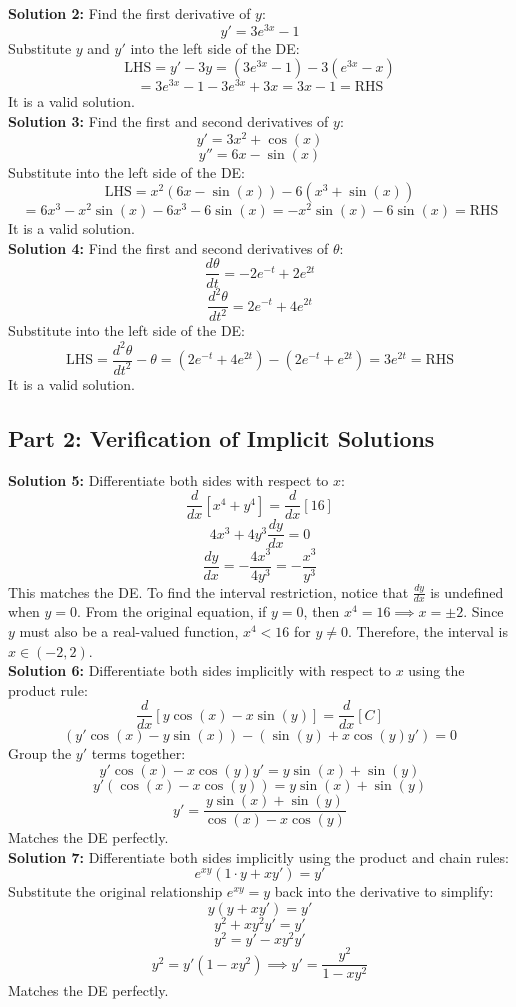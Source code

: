 \documentclass[12pt]{article}
\begin{document}
\noindent \textbf{Solution 2:} Find the first derivative of $y$:
$$y' = 3e^{3x} - 1$$
Substitute $y$ and $y'$ into the left side of the DE:
$$\text{LHS} = y' - 3y = (3e^{3x} - 1) - 3(e^{3x} - x)$$
$$= 3e^{3x} - 1 - 3e^{3x} + 3x = 3x - 1 = \text{RHS}$$
It is a valid solution. \\

\noindent \textbf{Solution 3:} Find the first and second derivatives of $y$:
$$y' = 3x^2 + \cos(x)$$
$$y'' = 6x - \sin(x)$$
Substitute into the left side of the DE:
$$\text{LHS} = x^2(6x - \sin(x)) - 6(x^3 + \sin(x))$$
$$= 6x^3 - x^2\sin(x) - 6x^3 - 6\sin(x) = -x^2\sin(x) - 6\sin(x) = \text{RHS}$$
It is a valid solution. \\

\noindent \textbf{Solution 4:} Find the first and second derivatives of $\theta$:
$$\frac{d\theta}{dt} = -2e^{-t} + 2e^{2t}$$
$$\frac{d^2\theta}{dt^2} = 2e^{-t} + 4e^{2t}$$
Substitute into the left side of the DE:
$$\text{LHS} = \frac{d^2\theta}{dt^2} - \theta = (2e^{-t} + 4e^{2t}) - (2e^{-t} + e^{2t}) = 3e^{2t} = \text{RHS}$$
It is a valid solution.

\subsection*{Part 2: Verification of Implicit Solutions}
\textbf{Solution 5:} Differentiate both sides with respect to $x$:
$$\frac{d}{dx}[x^4 + y^4] = \frac{d}{dx}[16]$$
$$4x^3 + 4y^3 \frac{dy}{dx} = 0$$
$$\frac{dy}{dx} = -\frac{4x^3}{4y^3} = -\frac{x^3}{y^3}$$
This matches the DE. To find the interval restriction, notice that $\frac{dy}{dx}$ is undefined when $y=0$. From the original equation, if $y=0$, then $x^4 = 16 \implies x = \pm 2$. Since $y$ must also be a real-valued function, $x^4 < 16$ for $y \neq 0$. Therefore, the interval is $x \in (-2, 2)$. \\

\noindent \textbf{Solution 6:} Differentiate both sides implicitly with respect to $x$ using the product rule:
$$\frac{d}{dx}[y \cos(x) - x \sin(y)] = \frac{d}{dx}[C]$$
$$\left( y' \cos(x) - y \sin(x) \right) - \left( \sin(y) + x \cos(y) y' \right) = 0$$
Group the $y'$ terms together:
$$y' \cos(x) - x \cos(y) y' = y \sin(x) + \sin(y)$$
$$y' (\cos(x) - x \cos(y)) = y \sin(x) + \sin(y)$$
$$y' = \frac{y \sin(x) + \sin(y)}{\cos(x) - x \cos(y)}$$
Matches the DE perfectly. \\

\noindent \textbf{Solution 7:} Differentiate both sides implicitly using the product and chain rules:
$$e^{xy} \left( 1 \cdot y + x y' \right) = y'$$
Substitute the original relationship $e^{xy} = y$ back into the derivative to simplify:
$$y(y + x y') = y'$$
$$y^2 + xy^2 y' = y'$$
$$y^2 = y' - xy^2 y'$$
$$y^2 = y'(1 - xy^2) \implies y' = \frac{y^2}{1 - xy^2}$$
Matches the DE perfectly. \\
\end{document}
